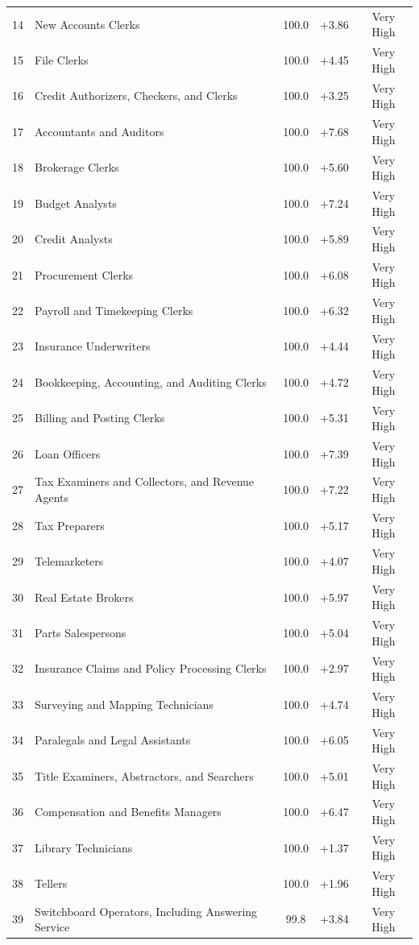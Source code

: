 {\begin{longtable}{rp{7cm}ccc}
14 & New Accounts Clerks & 100.0 & +3.86 & Very High \\
15 & File Clerks & 100.0 & +4.45 & Very High \\
16 & Credit Authorizers, Checkers, and Clerks & 100.0 & +3.25 & Very High \\
17 & Accountants and Auditors & 100.0 & +7.68 & Very High \\
18 & Brokerage Clerks & 100.0 & +5.60 & Very High \\
19 & Budget Analysts & 100.0 & +7.24 & Very High \\
20 & Credit Analysts & 100.0 & +5.89 & Very High \\
21 & Procurement Clerks & 100.0 & +6.08 & Very High \\
22 & Payroll and Timekeeping Clerks & 100.0 & +6.32 & Very High \\
23 & Insurance Underwriters & 100.0 & +4.44 & Very High \\
24 & Bookkeeping, Accounting, and Auditing Clerks & 100.0 & +4.72 & Very High \\
25 & Billing and Posting Clerks & 100.0 & +5.31 & Very High \\
26 & Loan Officers & 100.0 & +7.39 & Very High \\
27 & Tax Examiners and Collectors, and Revenue Agents & 100.0 & +7.22 & Very High \\
28 & Tax Preparers & 100.0 & +5.17 & Very High \\
29 & Telemarketers & 100.0 & +4.07 & Very High \\
30 & Real Estate Brokers & 100.0 & +5.97 & Very High \\
31 & Parts Salespersons & 100.0 & +5.04 & Very High \\
32 & Insurance Claims and Policy Processing Clerks & 100.0 & +2.97 & Very High \\
33 & Surveying and Mapping Technicians & 100.0 & +4.74 & Very High \\
34 & Paralegals and Legal Assistants & 100.0 & +6.05 & Very High \\
35 & Title Examiners, Abstractors, and Searchers & 100.0 & +5.01 & Very High \\
36 & Compensation and Benefits Managers & 100.0 & +6.47 & Very High \\
37 & Library Technicians & 100.0 & +1.37 & Very High \\
38 & Tellers & 100.0 & +1.96 & Very High \\
39 & Switchboard Operators, Including Answering Service & 99.8 & +3.84 & Very High \\

\end{longtable}}
